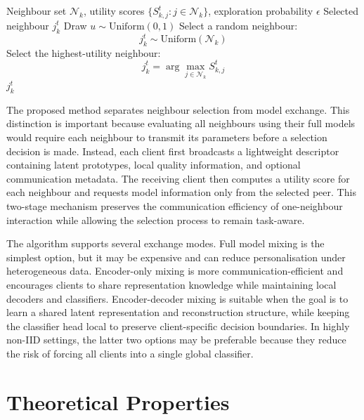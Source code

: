 \documentclass[conference]{IEEEtran}
\begin{document}
\begin{algorithm}[t]
\caption{$\epsilon$-Greedy Exploration-Aware Neighbour Selection}
\label{alg:epsilon_selection}
\footnotesize
\begin{algorithmic}[1]
\REQUIRE Neighbour set $\mathcal{N}_k$, utility scores $\{S_{k,j}^t:j\in\mathcal{N}_k\}$, exploration probability $\epsilon$
\ENSURE Selected neighbour $j_k^t$
\STATE Draw $u\sim \mathrm{Uniform}(0,1)$
    \STATE Select a random neighbour:
    \begin{equation}
j_k^t\sim \mathrm{Uniform}(\mathcal{N}_k)
\end{equation}
\ELSE
    \STATE Select the highest-utility neighbour:
    \begin{equation}
j_k^t
    =
    \arg\max_{j\in\mathcal{N}_k}
    S_{k,j}^{t}
\end{equation}
\ENDIF
\RETURN $j_k^t$
\end{algorithmic}
\end{algorithm}

The proposed method separates neighbour selection from model exchange. This distinction is important because evaluating all neighbours using their full models would require each neighbour to transmit its parameters before a selection decision is made. Instead, each client first broadcasts a lightweight descriptor containing latent prototypes, local quality information, and optional communication metadata. The receiving client then computes a utility score for each neighbour and requests model information only from the selected peer. This two-stage mechanism preserves the communication efficiency of one-neighbour interaction while allowing the selection process to remain task-aware.

The algorithm supports several exchange modes. Full model mixing is the simplest option, but it may be expensive and can reduce personalisation under heterogeneous data. Encoder-only mixing is more communication-efficient and encourages clients to share representation knowledge while maintaining local decoders and classifiers. Encoder-decoder mixing is suitable when the goal is to learn a shared latent representation and reconstruction structure, while keeping the classifier head local to preserve client-specific decision boundaries. In highly non-IID settings, the latter two options may be preferable because they reduce the risk of forcing all clients into a single global classifier.

\section{Theoretical Properties}
\label{sec:theory}
\end{document}
